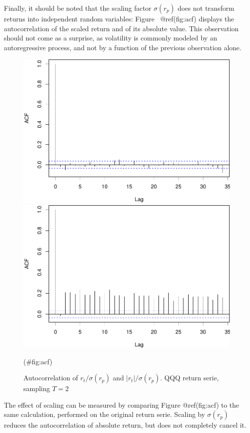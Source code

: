 \documentclass[
  11pt,
]{article}
\newenvironment{Shaded}{\begin{snugshade}}{\end{snugshade}}
\newcommand{\AttributeTok}[1]{\textcolor[rgb]{0.77,0.63,0.00}{#1}}
\newcommand{\DecValTok}[1]{\textcolor[rgb]{0.00,0.00,0.81}{#1}}
\newcommand{\FloatTok}[1]{\textcolor[rgb]{0.00,0.00,0.81}{#1}}
\newcommand{\FunctionTok}[1]{\textcolor[rgb]{0.00,0.00,0.00}{#1}}
\newcommand{\NormalTok}[1]{#1}
\newcommand{\OtherTok}[1]{\textcolor[rgb]{0.56,0.35,0.01}{#1}}
\newcommand{\SpecialCharTok}[1]{\textcolor[rgb]{0.00,0.00,0.00}{#1}}
\newcommand{\StringTok}[1]{\textcolor[rgb]{0.31,0.60,0.02}{#1}}
\begin{document}
Finally, it should be noted that the scaling factor \(\sigma(r_p)\) does
not transform returns into independent random variables: Figure~
@ref(fig:acf) displays the autocorrelation of the scaled return and of
its absolute value. This observation should not come as a surprise, as
volatility is commonly modeled by an autoregressive process, and not by
a function of the previous observation alone.

\begin{Shaded}
\end{Shaded}

\begin{figure}[H]
\includegraphics[width=0.5\linewidth]{figs/acf-1} \includegraphics[width=0.5\linewidth]{figs/acf-2} \caption{Autocorrelation of $r_t/\sigma(r_p)$ and $|r_t|/\sigma(r_p)$. QQQ return serie, sampling $T=2$}(\#fig:acf)
\end{figure}

The effect of scaling can be measured by comparing Figure @ref(fig:acf)
to the same calculation, performed on the original return serie. Scaling
by \(\sigma(r_p)\) reduces the autocorrelation of absolute return, but
does not completely cancel it.
\end{document}
